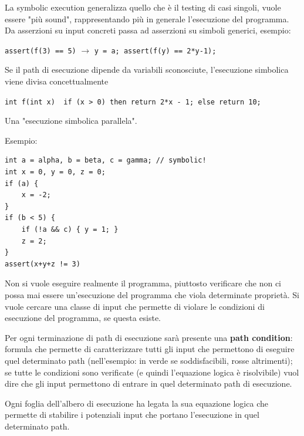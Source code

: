 La symbolic execution generalizza quello che è il testing di casi singoli, vuole essere "più sound", rappresentando più in generale l'esecuzione del programma. Da asserzioni su input concreti passa ad asserzioni su simboli generici, esempio: 
\begin{center}
	\texttt{assert(f(3) == 5)} $\longrightarrow$ \texttt{y = a; assert(f(y) == 2*y-1);}
\end{center}

Se il path di esecuzione dipende da variabili sconosciute, l'esecuzione simbolica viene divisa concettualmente
\begin{center}
	\texttt{int f(int x) { if (x > 0) then return 2*x - 1; else return 10; }}
\end{center}

Una "esecuzione simbolica parallela".

Esempio: 
\begin{center}
	\begin{minipage}{0.78\linewidth}
		\begin{verbatim}
int a = alpha, b = beta, c = gamma; // symbolic!
int x = 0, y = 0, z = 0;
if (a) {
    x = -2;
}
if (b < 5) {
    if (!a && c) { y = 1; }
    z = 2;
}
assert(x+y+z != 3)
		\end{verbatim}
	\end{minipage}
\end{center}

\begin{center}
	
\end{center}

Non si vuole eseguire realmente il programma, piuttosto verificare che non ci possa mai essere un'esecuzione del programma che viola determinate proprietà. Si vuole cercare una classe di input che permette di violare le condizioni di esecuzione del programma, se questa esiste.

Per ogni terminazione di path di esecuzione sarà presente una \textbf{path condition}: formula che permette di caratterizzare tutti gli input che permettono di eseguire quel determinato path (nell'esempio: in verde se soddisfacibili, rosse altrimenti); se tutte le condizioni sono verificate (e quindi l'equazione logica è risolvibile) vuol dire che gli input permettono di entrare in quel determinato path di esecuzione.

Ogni foglia dell'albero di esecuzione ha legata la sua equazione logica che permette di stabilire i potenziali input che portano l'esecuzione in quel determinato path.

